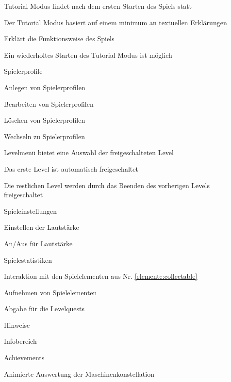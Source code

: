 \documentclass{scrartcl}
\begin{document}
\begin{falist}
	\item Tutorial Modus findet nach dem ersten Starten des Spiels statt
	\begin{falist}
        \item Der Tutorial Modus basiert auf einem minimum an textuellen Erklärungen
        \item Erklärt die Funktionsweise des Spiels
		\item Ein wiederholtes Starten des Tutorial Modus ist möglich
	\end{falist}
	\item Spielerprofile
	\begin{falist}
		\item Anlegen von Spielerprofilen
		\item Bearbeiten von Spielerprofilen
		\item Löschen von Spielerprofilen
		\item Wechseln zu Spielerprofilen
	\end{falist}
	\item Levelmenü bietet eine Auswahl der freigeschalteten Level
    \begin{falist}
        \item Das erste Level ist automatisch freigeschaltet
        \item Die restlichen Level werden durch das Beenden des vorherigen Levels freigeschaltet
    \end{falist}
	\item Spieleinstellungen
	\begin{falist}
		\item Einstellen der Lautstärke
		\item An/Aus für Lautstärke
	\end{falist}
	\item Spielestatistiken
	\begin{falist}
		\item
	\end{falist}
	\item Interaktion mit den Spielelementen aus Nr. \ref{elemente:collectable}
	\begin{falist}
		\item Aufnehmen von Spielelementen
		\item Abgabe für die Levelquests
	\end{falist}
	\item Hinweise
	\item Infobereich
    \item Achievements
    \item Animierte Auswertung der Maschinenkonstellation
\end{falist}
\end{document}
